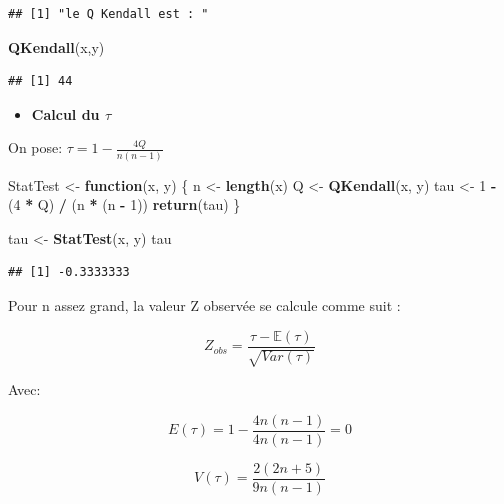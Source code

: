 \documentclass[
  12pt,
]{article}
\newenvironment{Shaded}{\begin{snugshade}}{\end{snugshade}}
\newcommand{\ControlFlowTok}[1]{\textcolor[rgb]{0.13,0.29,0.53}{\textbf{#1}}}
\newcommand{\DecValTok}[1]{\textcolor[rgb]{0.00,0.00,0.81}{#1}}
\newcommand{\FunctionTok}[1]{\textcolor[rgb]{0.13,0.29,0.53}{\textbf{#1}}}
\newcommand{\NormalTok}[1]{#1}
\newcommand{\OtherTok}[1]{\textcolor[rgb]{0.56,0.35,0.01}{#1}}
\newcommand{\SpecialCharTok}[1]{\textcolor[rgb]{0.81,0.36,0.00}{\textbf{#1}}}
\providecommand{\tightlist}{%
  \setlength{\itemsep}{0pt}\setlength{\parskip}{0pt}}
\begin{document}
\begin{verbatim}
## [1] "le Q Kendall est : "
\end{verbatim}

\begin{Shaded}
\begin{Highlighting}[]
\FunctionTok{QKendall}\NormalTok{(x,y)}
\end{Highlighting}
\end{Shaded}

\begin{verbatim}
## [1] 44
\end{verbatim}

\begin{itemize}
\tightlist
\item
  \textbf{Calcul du \(\tau\)}
\end{itemize}

On pose: \(\tau = 1 - \frac{4Q}{n(n-1)}\)

\begin{Shaded}
\begin{Highlighting}[]
\NormalTok{StatTest }\OtherTok{\textless{}{-}} \ControlFlowTok{function}\NormalTok{(x, y) \{}
\NormalTok{  n }\OtherTok{\textless{}{-}} \FunctionTok{length}\NormalTok{(x)}
\NormalTok{  Q }\OtherTok{\textless{}{-}} \FunctionTok{QKendall}\NormalTok{(x, y)}
\NormalTok{  tau }\OtherTok{\textless{}{-}} \DecValTok{1} \SpecialCharTok{{-}}\NormalTok{ (}\DecValTok{4} \SpecialCharTok{*}\NormalTok{ Q) }\SpecialCharTok{/}\NormalTok{ (n }\SpecialCharTok{*}\NormalTok{ (n }\SpecialCharTok{{-}} \DecValTok{1}\NormalTok{))}
  \FunctionTok{return}\NormalTok{(tau)}
\NormalTok{\}}

\NormalTok{tau }\OtherTok{\textless{}{-}} \FunctionTok{StatTest}\NormalTok{(x, y)}
\NormalTok{tau}
\end{Highlighting}
\end{Shaded}

\begin{verbatim}
## [1] -0.3333333
\end{verbatim}

Pour n assez grand, la valeur Z observée se calcule comme suit :

\[
Z_{obs} = \frac{\tau - \mathbb{E}(\tau)}{\sqrt{Var(\tau)}}
\]

Avec:

\[
E(\tau) = 1 - \frac{4n(n-1)}{4n(n-1)} = 0
\]

\[
V(\tau) = \frac{2(2n+5)}{9n(n-1)}
\]
\end{document}
